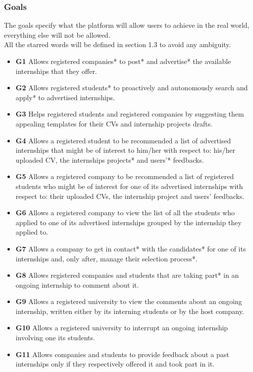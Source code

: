 \documentclass{article}
\begin{document}
\subsubsection{Goals}
The goals specify what the platform will allow users to achieve in the real world, everything else will not be allowed. 
\\All the starred words will be defined in section 1.3 to avoid any ambiguity.
\begin{itemize}
  \item \textbf{G1} Allows registered companies* to post* and advertise* the available internships that they offer.
  \item \textbf{G2} Allows registered students* to proactively and autonomously search and apply* to advertised internships.
  \item \textbf{G3} Helps registered students and registered companies by suggesting them appealing templates for their CVs and internship projects drafts.
  \item \textbf{G4} Allows a registered student to be recommended a list of advertised internships that might be of interest to him/her with respect to: his/her uploaded CV, the internships projects* and users'* feedbacks.
  \item \textbf{G5} Allows a registered company to be recommended a list of registered students who might be of interest for one of its advertised internships with respect to: their uploaded CVs, the internship project and users' feedbacks.
  \item \textbf{G6} Allows a registered company to view the list of all the students who applied to one of its advertised internships grouped by the internship they applied to.
  \item \textbf{G7} Allows a company to get in contact* with the candidates* for one of its internships and, only after, manage their selection process*.
  \item \textbf{G8} Allows registered companies and students that are taking part* in an ongoing internship to comment about it.
  \item \textbf{G9} Allows a registered university to view the comments about an ongoing internship, written either by its interning students or by the host company.
  \item \textbf{G10} Allows a registered university to interrupt an ongoing internship involving one its students.
      \item \textbf{G11} Allows companies and students to provide feedback about a past internships only if they respectively offered it and took part in it.

\end{itemize}
\end{document}
